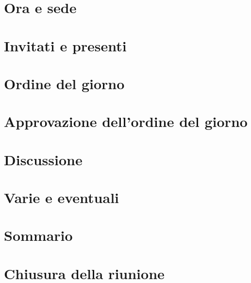 \section*{Ora e sede}

\section*{Invitati e presenti}

\section*{Ordine del giorno}

\section*{Approvazione dell'ordine del giorno}

\section*{Discussione}

\section*{Varie e eventuali}

\section*{Sommario}

\section*{Chiusura della riunione}
